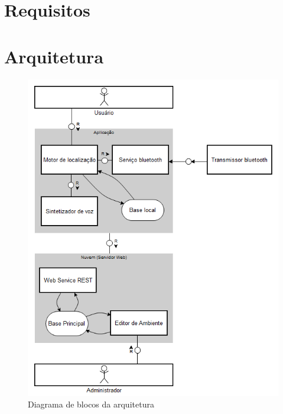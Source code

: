 \documentclass[english,brazilian]{UNISINOSmonografia}
\begin{document}
	\section{Requisitos}

	\section{Arquitetura}
 

\FloatBarrier 
\begin{figure}
	\caption{Diagrama de blocos da arquitetura}
	\label{fig:arquitetura}
	\centering%
	\begin{minipage}{.8\textwidth}
		\includegraphics[width=\textwidth]{imgs/arquitetura.png}
	\end{minipage}
\end{figure}
\FloatBarrier 




\end{document}
